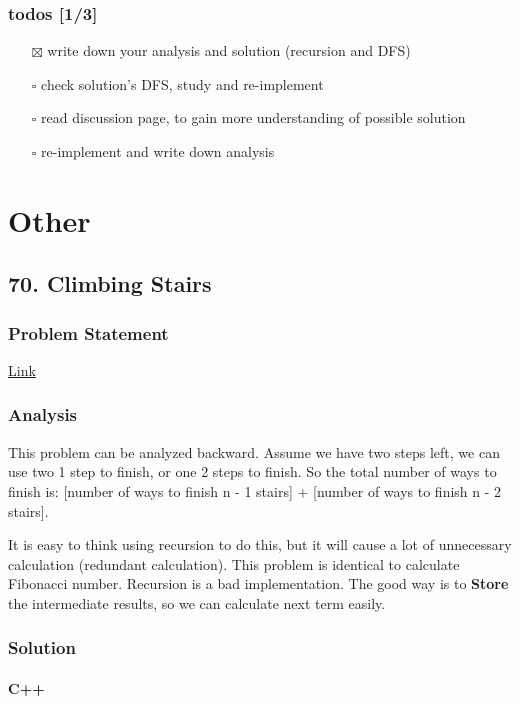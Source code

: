 \documentclass[12pt]{book}
\begin{document}
\section{todos [1/3]}
\label{sec:org7a4de63}
\begin{itemize}
\item[{$\boxtimes$}] write down your analysis and solution (recursion and DFS)
\item[{$\square$}] check solution's DFS, study and re-implement
\item[{$\square$}] read discussion page, to gain more understanding of possible solution
\item[{$\square$}] re-implement and write down analysis
\end{itemize}
\part{Other}
\label{sec:orgb986af3}
\chapter{70. Climbing Stairs}
\label{sec:org25a9093}
\section{Problem Statement}
\label{sec:org65b3a4c}
\href{https://leetcode.com/problems/climbing-stairs/}{Link}
\section{Analysis}
\label{sec:orgfd8de4e}
This problem can be analyzed backward. Assume we have two steps left, we can use two 1 step to finish, or one 2 steps to finish. So the total number of ways to finish is: [number of ways to finish n - 1 stairs] + [number of ways to finish n - 2 stairs].

It is easy to think using recursion to do this, but it will cause a lot of unnecessary calculation (redundant calculation). This problem is identical to calculate Fibonacci number. Recursion is a bad implementation. The good way is to \textbf{Store} the intermediate results, so we can calculate next term easily.

\section{Solution}
\label{sec:org823db24}
\subsection{C++}
\label{sec:orga1be6e5}
\end{document}
